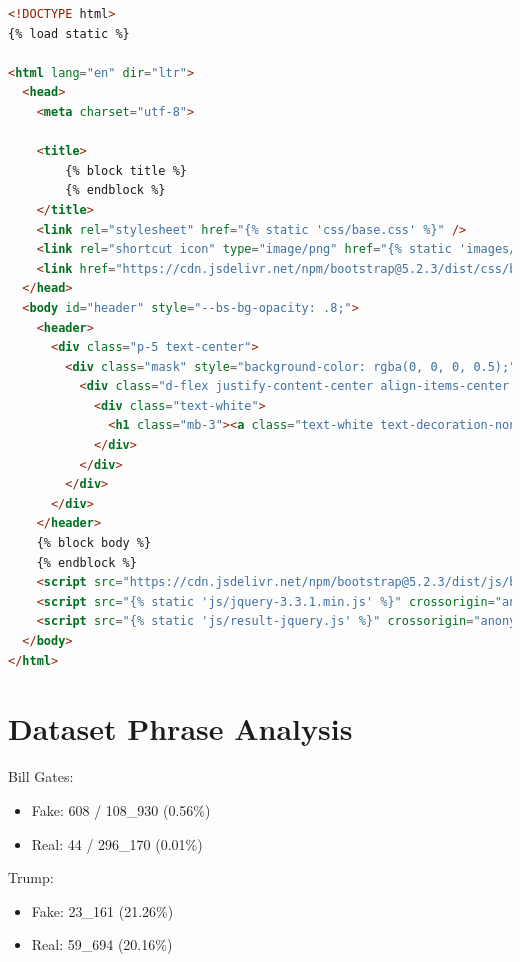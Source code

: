 \documentclass{l4proj}
\begin{document}
\begin{appendices}
\begin{lstlisting}[language=HTML, float, caption={The base template, using inheritance in the title and body blocks, with Bootstrap linked in the template.}, label=lst:base_template_full]
<!DOCTYPE html>
{% load static %}

<html lang="en" dir="ltr">
  <head>
    <meta charset="utf-8">

    <title>
        {% block title %}
        {% endblock %}
    </title>
    <link rel="stylesheet" href="{% static 'css/base.css' %}" />
    <link rel="shortcut icon" type="image/png" href="{% static 'images/favicon.ico' %}"/>
    <link href="https://cdn.jsdelivr.net/npm/bootstrap@5.2.3/dist/css/bootstrap.min.css" rel="stylesheet" integrity="sha384-rbsA2VBKQhggwzxH7pPCaAqO46MgnOM80zW1RWuH61DGLwZJEdK2Kadq2F9CUG65" crossorigin="anonymous">
  </head>
  <body id="header" style="--bs-bg-opacity: .8;">
    <header>
      <div class="p-5 text-center">
        <div class="mask" style="background-color: rgba(0, 0, 0, 0.5);">
          <div class="d-flex justify-content-center align-items-center h-100">
            <div class="text-white">
              <h1 class="mb-3"><a class="text-white text-decoration-none" href="{% url 'home' %}">Fake News Classification</a></h1>
            </div>
          </div>
        </div>
      </div>
    </header>
    {% block body %}
    {% endblock %}
    <script src="https://cdn.jsdelivr.net/npm/bootstrap@5.2.3/dist/js/bootstrap.bundle.min.js" integrity="sha384-kenU1KFdBIe4zVF0s0G1M5b4hcpxyD9F7jL+jjXkk+Q2h455rYXK/7HAuoJl+0I4" crossorigin="anonymous"></script>
    <script src="{% static 'js/jquery-3.3.1.min.js' %}" crossorigin="anonymous"></script>
    <script src="{% static 'js/result-jquery.js' %}" crossorigin="anonymous"></script>
  </body>
</html>

\end{lstlisting}

\chapter{Dataset Phrase Analysis}
\label{app:phrase_anal}

Bill Gates:
\begin{itemize}
    \item Fake: 608 / 108\_930 (0.56\%)
    \item Real: 44 / 296\_170 (0.01\%)
\end{itemize}

Trump:
\begin{itemize}
\item Fake: 23\_161 (21.26\%)
\item Real: 59\_694 (20.16\%)
\end{itemize}


\end{appendices}
\end{document}
